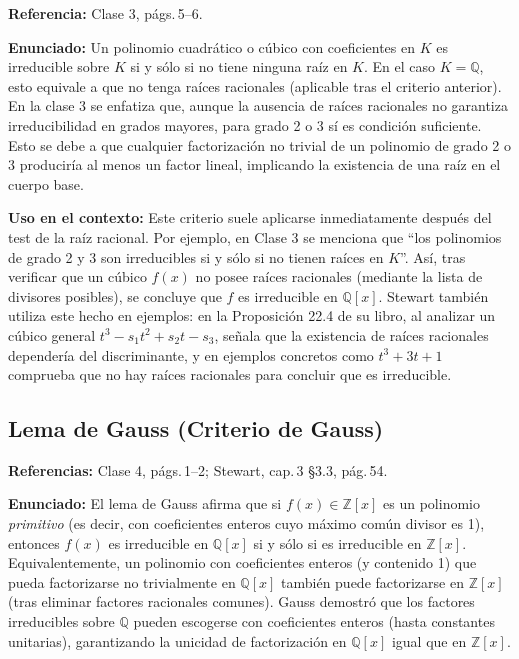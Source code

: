 \documentclass[12pt, letter]{article}
\begin{document}
\textbf{Referencia:} Clase 3, págs.\,5–6.

\textbf{Enunciado:}  
Un polinomio cuadrático o cúbico con coeficientes en $K$ es irreducible sobre $K$ si y sólo si no tiene ninguna raíz en $K$.  
En el caso $K=\mathbb{Q}$, esto equivale a que no tenga raíces racionales (aplicable tras el criterio anterior).  
En la clase 3 se enfatiza que, aunque la ausencia de raíces racionales no garantiza irreducibilidad en grados mayores, para grado 2 o 3 sí es condición suficiente.  
Esto se debe a que cualquier factorización no trivial de un polinomio de grado 2 o 3 produciría al menos un factor lineal, implicando la existencia de una raíz en el cuerpo base.

\textbf{Uso en el contexto:}  
Este criterio suele aplicarse inmediatamente después del test de la raíz racional.  
Por ejemplo, en Clase 3 se menciona que “los polinomios de grado 2 y 3 son irreducibles si y sólo si no tienen raíces en $K$”.  
Así, tras verificar que un cúbico $f(x)$ no posee raíces racionales (mediante la lista de divisores posibles), se concluye que $f$ es irreducible en $\mathbb{Q}[x]$.  
Stewart también utiliza este hecho en ejemplos: en la Proposición 22.4 de su libro, al analizar un cúbico general $t^{3}-s_{1}t^{2}+s_{2}t-s_{3}$, señala que la existencia de raíces racionales dependería del discriminante, y en ejemplos concretos como $t^{3}+3t+1$ comprueba que no hay raíces racionales para concluir que es irreducible.

\subsection*{Lema de Gauss (Criterio de Gauss)}

\textbf{Referencias:} Clase 4, págs.\,1–2; Stewart, cap.\,3 §3.3, pág.\,54.

\textbf{Enunciado:}  
El lema de Gauss afirma que si $f(x)\in\mathbb{Z}[x]$ es un polinomio \emph{primitivo} (es decir, con coeficientes enteros cuyo máximo común divisor es 1), entonces $f(x)$ es irreducible en $\mathbb{Q}[x]$ si y sólo si es irreducible en $\mathbb{Z}[x]$.  
Equivalentemente, un polinomio con coeficientes enteros (y contenido 1) que pueda factorizarse no trivialmente en $\mathbb{Q}[x]$ también puede factorizarse en $\mathbb{Z}[x]$ (tras eliminar factores racionales comunes).  
Gauss demostró que los factores irreducibles sobre $\mathbb{Q}$ pueden escogerse con coeficientes enteros (hasta constantes unitarias), garantizando la unicidad de factorización en $\mathbb{Q}[x]$ igual que en $\mathbb{Z}[x]$.
\end{document}
